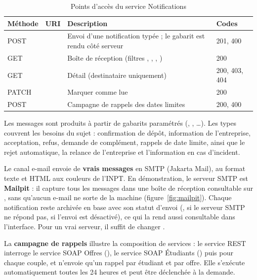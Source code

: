 \begin{table}[htbp]
\centering\small
\caption{Points d'accès du service Notifications}
\begin{tabularx}{\textwidth}{@{}llYl@{}}
\toprule
\textbf{Méthode} & \textbf{URI} & \textbf{Description} & \textbf{Codes} \\
\midrule
POST &  & Envoi d'une notification typée  ; le gabarit est rendu côté serveur & 201, 400 \\
GET &  & Boîte de réception (filtres , , , ) & 200 \\
GET &  & Détail (destinataire uniquement) & 200, 403, 404 \\
PATCH &  & Marquer comme lue & 200 \\
POST &  & Campagne de rappels des dates limites  & 200, 400 \\
\bottomrule
\end{tabularx}
\end{table}

Les messages sont produits à partir de gabarits paramétrés (, ,
…). Les types couvrent les besoins du sujet : confirmation de dépôt, information de l'entreprise,
acceptation, refus, demande de complément, rappels de date limite, ainsi que le rejet automatique, la relance de
l'entreprise et l'information en cas d'incident.

Le canal e-mail envoie de \textbf{vrais messages} en SMTP (Jakarta Mail), au format texte et HTML aux couleurs de
l'INPT. En démonstration, le serveur SMTP est \textbf{Mailpit} : il capture tous les messages dans une boîte de
réception consultable sur , sans qu'aucun e-mail ne sorte de la machine
(figure~\ref{fig:mailpit}). Chaque notification reste archivée en base avec son statut d'envoi (,
 si le serveur SMTP ne répond pas,  si l'envoi est désactivé), ce qui la rend
aussi consultable dans l'interface. Pour un vrai serveur, il suffit de changer .

La \textbf{campagne de rappels} illustre la composition de services : le service REST interroge le service SOAP Offres
(), le service SOAP Étudiants () puis
 pour chaque couple, et n'envoie qu'un rappel par étudiant et par offre. Elle s'exécute
automatiquement toutes les 24 heures et peut être déclenchée à la demande.


